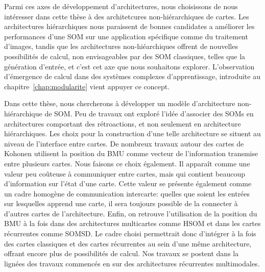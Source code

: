\documentclass[../main]{subfiles}
\begin{document}
Parmi ces axes de développement d'architectures, nous choisissons de nous intéresser dans cette thèse à des architetcures non-hiérarchiques de cartes.
Les architectures hiérarchiques nous paraissent de bonnes candidates a améliorer les performances d'une SOM sur une application spécifique comme du traitement d'images, tandis que les architectures non-hiéarchiques offrent de nouvelles possibilités de calcul, non envisageables par des SOM classiques, telles que la génération d'entrée, et c'est cet axe que nous souhaitons explorer. L'observation d'émergence de calcul dans des systèmes complexes d'apprentissage, introduite au chapitre~\ref{chap:modularite} vient appuyer ce concept.

Dans cette thèse, nous chercherons à développer un modèle d'architecture non-hiérarchique de SOM. Peu de travaux ont exploré l'idée d'associer des SOMs en architectures comportant des rétroactions, et non seulement en architecture hiérarchiques.
Les choix pour la construction d'une telle architecture se situent au niveau de l'interface entre cartes. De nombreux travaux autour des cartes de Kohonen utilisent la position du BMU comme vecteur de l'information transmise entre plusieurs cartes. 
Nous faisons ce choix également. Il apparaît comme une valeur peu coûteuse à communiquer entre cartes, mais qui contient beaucoup d'information sur l'état d'une carte. Cette valeur se présente également comme un cadre homogène de communication intercarte: quelles que soient les entrées sur lesquelles apprend une carte, il sera toujours possible de la connecter à d'autres cartes de l'architecture. Enfin, on retrouve l'utilisation de la position du BMU à la fois dans des architectures multicartes comme HSOM et dans les cartes récurrentes comme SOMSD. Le cadre choisi permettrait donc d'intégrer à la fois des cartes classiques et des cartes récurrentes au sein d'une même architecture, offrant encore plus de possibilités de calcul. Nos travaux se postent dans la lignées des travaux commencés en \cite{baheux_towards_2014} sur des architectures récurrentes multimodales.
% 

\ifSubfilesClassLoaded{
    \printbibliography
}{}
\end{document}
